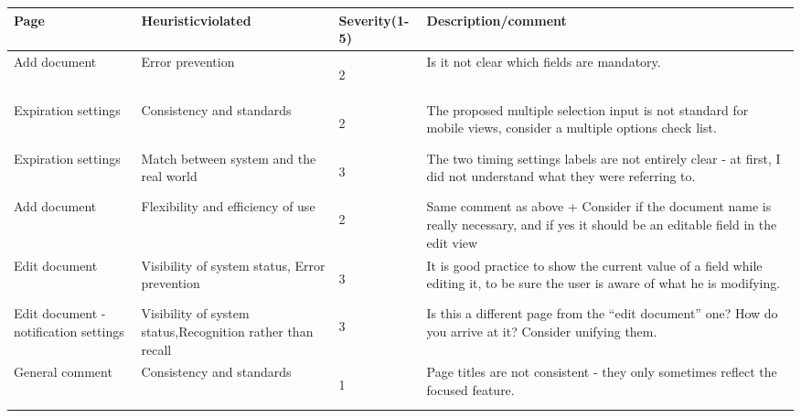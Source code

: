 \begin{table}[H]
	\begin{tabularx}{\textwidth}{|X|X|X|X|}
		\hline
		\textbf{Page} & \textbf{Heuristic\newline violated} & \textbf{Severity(1-5)} & \textbf{Description/\newline comment} \\
		\hline
		Add document & Error prevention & \begin{center} 2 \end{center} & Is it not clear which fields are mandatory. \\
		\hline
		Expiration settings & Consistency and standards & \begin{center} 2 \end{center} & The proposed multiple selection input is not standard for mobile views, consider a multiple options check list. \\
		\hline
		Expiration settings & Match between system and the real world & \begin{center} 3 \end{center} & The two timing settings labels are not entirely clear - at first, I did not understand what they were referring to. \\
		\hline
		Add document & Flexibility and efficiency of use & \begin{center} 2 \end{center} &Same comment as above + Consider if the document name is really necessary, and if yes it should be an editable field in the edit view \\
		\hline
		Edit document & Visibility of system status, Error prevention & \begin{center} 3 \end{center} &It is good practice to show the current value of a field while editing it, to be sure the user is aware of what he is modifying. \\
		\hline
		Edit document - notification settings & Visibility of system status,Recognition rather than recall & \begin{center} 3 \end{center} &Is this a different page from the “edit document” one? How do you arrive at it? Consider unifying them.\\
		\hline
		General comment & Consistency and standards & \begin{center} 1 \end{center} &Page titles are not consistent - they only sometimes reflect the focused feature.\\
		\hline
	\end{tabularx}
\end{table}
\clearpage
